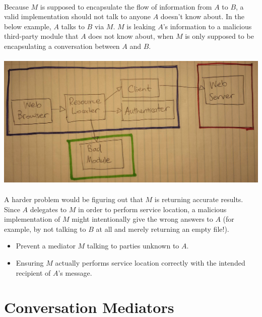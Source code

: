 \documentclass{article}
\begin{document}
\paragraph{}
Because $M$ is supposed to encapsulate the flow of information from $A$ to $B$, a valid implementation should not talk to anyone $A$ doesn't know about. In the below example, $A$ talks to $B$ via $M$. $M$ is leaking $A$'s information to a malicious third-party module that $A$ does not know about, when $M$ is only supposed to be encapsulating a conversation between $A$ and $B$.

\paragraph{}
\includegraphics[width=\textwidth]{service-mediator-bad.jpeg}

\paragraph{}
A harder problem would be figuring out that $M$ is returning accurate results. Since $A$ delegates to $M$ in order to perform service location, a malicious implementation of $M$ might intentionally give the wrong answers to $A$ (for example, by not talking to $B$ at all and merely returning an empty file!).

\begin{itemize}
	\item Prevent a mediator $M$ talking to parties unknown to $A$.
	\item Ensuring $M$ actually performs service location correctly with the intended recipient of $A$'s message.
\end{itemize}

\section{Conversation Mediators}
\end{document}
